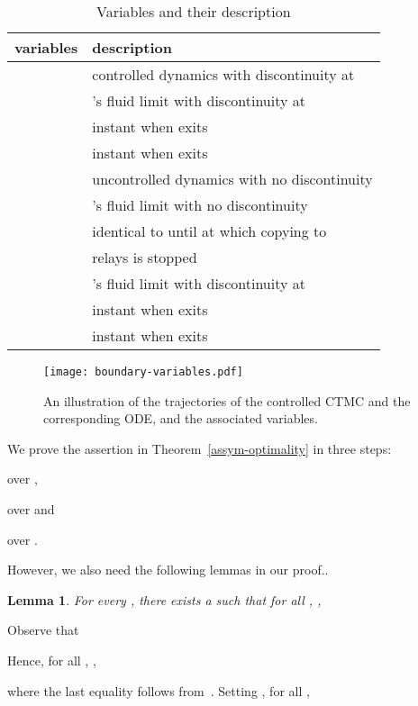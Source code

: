 \documentclass[10pt,journal,letterpaper]{IEEEtran}
\newtheorem{lemma}{Lemma}[section]
\begin{document}
\begin{table}[t]
\renewcommand{\arraystretch}{1.3}
\caption{Variables and their description}
\label{variables-description}
\centering
\begin{tabular}{l|l}
\hline
\bfseries variables & \bfseries description \\
\hline
  & controlled dynamics with discontinuity at  \\
  & 's fluid limit with discontinuity at  \\
  & instant when  exits  \\
  & instant when  exits  \\
  & uncontrolled dynamics with no discontinuity \\
  & 's fluid limit with no discontinuity \\
  & identical to  until  at which
 copying to \\
        & relays is stopped \\
  & 's fluid limit with discontinuity at  \\
  & instant when  exits  \\
  & instant when  exits  \\
\hline
\end{tabular}
\end{table}


\begin{figure}[b]
\centering
\texttt{[image: boundary-variables.pdf]}
\caption{An illustration of the trajectories of the controlled CTMC and the corresponding ODE, and the associated variables.}
\label{fig:boundries}
\end{figure}

We prove the assertion in Theorem~\ref{assym-optimality} in three
steps:
\begin{inparaenum}[(a)]
\item over ,
\item over  and
\item over .
\end{inparaenum}
However, we also need the following lemmas in our proof..
\begin{lemma}
\label{epsi-tau} For every , there exists a
 such that for all , ,

\end{lemma}
\begin{IEEEproof}
Observe that

Hence, for all , ,

where the last equality follows
from~\cite[Theorem~2.8]{stochproc.darling02fluid-limits}. Setting
, for all
, 

\end{IEEEproof}
\end{document}

